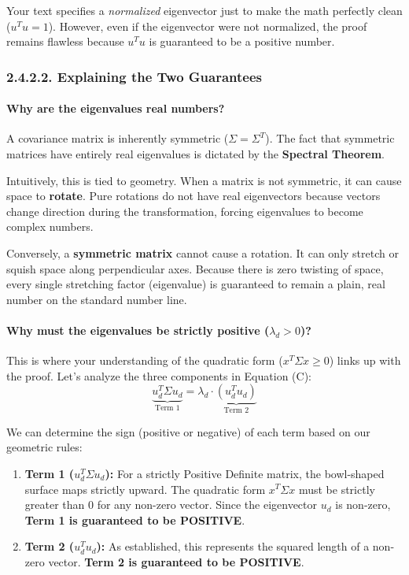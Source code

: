 \documentclass{article}
\begin{document}
Your text specifies a \textit{normalized} eigenvector just to make the math perfectly clean ($u^T u = 1$). However, even if the eigenvector were not normalized, the proof remains flawless because $u^T u$ is guaranteed to be a positive number.

\subsubsection*{2.4.2.2. Explaining the Two Guarantees}

\paragraph{Why are the eigenvalues real numbers?}
A covariance matrix is inherently symmetric ($\Sigma = \Sigma^T$). The fact that symmetric matrices have entirely real eigenvalues is dictated by the \textbf{Spectral Theorem}. 

Intuitively, this is tied to geometry. When a matrix is not symmetric, it can cause space to \textbf{rotate}. Pure rotations do not have real eigenvectors because vectors change direction during the transformation, forcing eigenvalues to become complex numbers. 

Conversely, a \textbf{symmetric matrix} cannot cause a rotation. It can only stretch or squish space along perpendicular axes. Because there is zero twisting of space, every single stretching factor (eigenvalue) is guaranteed to remain a plain, real number on the standard number line.

\paragraph{Why must the eigenvalues be strictly positive ($\lambda_d > 0$)?}
This is where your understanding of the quadratic form ($x^T \Sigma x \geq 0$) links up with the proof. Let's analyze the three components in Equation (C):
\[ \underbrace{u_d^T \Sigma u_d}_{\text{Term 1}} = \lambda_d \cdot \underbrace{(u_d^T u_d)}_{\text{Term 2}} \]

We can determine the sign (positive or negative) of each term based on our geometric rules:
\begin{enumerate}
    \item \textbf{Term 1 ($u_d^T \Sigma u_d$):} For a strictly Positive Definite matrix, the bowl-shaped surface maps strictly upward. The quadratic form $x^T \Sigma x$ must be strictly greater than $0$ for any non-zero vector. Since the eigenvector $u_d$ is non-zero, \textbf{Term 1 is guaranteed to be POSITIVE}.
    \item \textbf{Term 2 ($u_d^T u_d$):} As established, this represents the squared length of a non-zero vector. \textbf{Term 2 is guaranteed to be POSITIVE}.
\end{enumerate}
\end{document}
